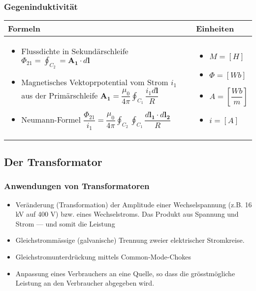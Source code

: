    	\subsubsection{Gegeninduktivität}										
\begin{tabular}{ | m{15cm} | m{3cm}  | }
	\hline
	Formeln & Einheiten \\ \hline
	\hline
	\begin{itemize}
		\item[] Flussdichte in Sekundärschleife $\Phi_{21}=\displaystyle\oint_{C_2}=\mathbf{A_1}\cdot d\mathbf{l}$
		\item[] Magnetisches Vektoprpotential vom Strom $i_1$ aus der Primärschleife $\mathbf{A_1}=\dfrac{\mu_0}{4\pi}\displaystyle\oint_{C_1}\dfrac{i_1d\mathbf{l}}{R}$
		\item[]  Neumann-Formel $\dfrac{\Phi_{21}}{i_1}=\dfrac{\mu_0}{4\pi}\displaystyle\oint_{C_2}\displaystyle\oint_{C_1}\dfrac{d\mathbf{l_1}\cdot d\mathbf{l_2}}{R}$
	\end{itemize} 
	&   	
	\begin{itemize}
		\item[] $M = [H]$
		\item[] $\Phi= [Wb]$
		\item[] $A=[\dfrac{Wb}{m}]$
		\item[] $i=[A]$
	\end{itemize} 
	\\ \hline
\end{tabular}

\subsection{Der Transformator}
\subsubsection{Anwendungen von Transformatoren}
\begin{itemize}
	\item Veränderung (Transformation) der Amplitude einer Wechselspannung (z.B. 16 kV auf 400 V)
	bzw. eines Wechselstroms. Das Produkt aus Spannung und Strom — und somit die Leistung
	\item Gleichstrommässige (galvanische) Trennung zweier elektrischer Stromkreise.
	\item Gleichstromunterdrückung mittels Common-Mode-Chokes
	\item Anpassung eines Verbrauchers an eine Quelle, so dass die grösstmögliche Leistung an den
	Verbraucher abgegeben wird.
\end{itemize}


